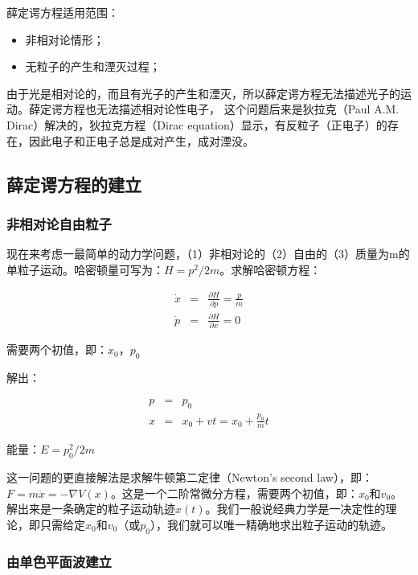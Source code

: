 薛定谔方程适用范围：

\begin{itemize}
    \item 非相对论情形；
    \item 无粒子的产生和湮灭过程；
\end{itemize}

由于光是相对论的，而且有光子的产生和湮灭，所以薛定谔方程无法描述光子的运动。薛定谔方程也无法描述相对论性电子，
这个问题后来是狄拉克（Paul A.M. Dirac）解决的，狄拉克方程（Dirac
equation）显示，有反粒子（正电子）的存在，因此电子和正电子总是成对产生，成对湮没。

\subsection{薛定谔方程的建立}

\subsubsection{非相对论自由粒子}


现在来考虑一最简单的动力学问题，（1）非相对论的（2）自由的（3）质量为m的单粒子运动。哈密顿量可写为：$H
= p^2/2m$。求解哈密顿方程：

\begin{eqnarray}
\dot x &=& \frac{\partial H}{\partial p} = \frac{p}{m} \\
\dot p &=& \frac{\partial H}{\partial x} = 0
\end{eqnarray}

需要两个初值，即：$x_0$，$p_0$

解出：

\begin{eqnarray}
p &=& p_0 \\
x & = & x_0 + vt = x_0 + \frac{p_0  }{m } t 
\end{eqnarray}

能量：$E = p^2_0 /2m$

这一问题的更直接解法是求解牛顿第二定律（Newton's second
law），即：$F = m \ddot x =- \nabla
V(x)$。这是一个二阶常微分方程，需要两个初值，即：$x_0$和$v_0$。解出来是一条确定的粒子运动轨迹$x(t)$。我们一般说经典力学是一决定性的理论，即只需给定$x_0$和$v_0$（或$p_0$），我们就可以唯一精确地求出粒子运动的轨迹。

\subsubsection{由单色平面波建立}

